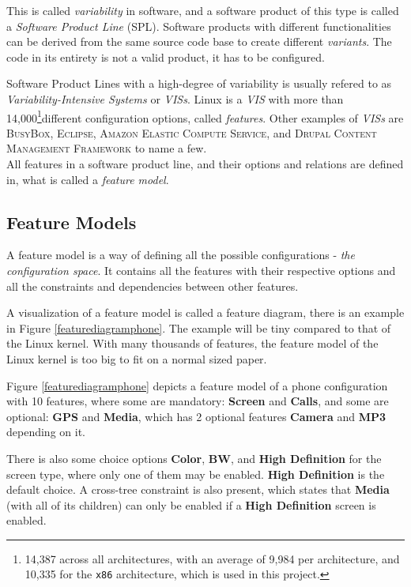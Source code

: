 \documentclass[a4paper,11pt]{report}
\newcommand{\f}{\footnote{\fn}}
\begin{document}
This is called \emph{variability} in software, and a software product of 
this type is called a \emph{Software Product Line} (SPL). Software products 
with different functionalities can be derived from the same 
source code base to create different \emph{variants}. The code in its entirety is not a valid product\cite[p. 
1]{IntDatSPL}, it has to be configured.
\\

        \def \fn {14,387 across all architectures, with an average of 9,984 per 
        architecture, and 10,335 for the \texttt{x86} architecture, which is used
        in this project.}

Software Product Lines with a high-degree of variability is usually refered to as 
\emph{Variability-Intensive Systems} or \emph{VISs}. Linux is a \emph{VIS} with 
more than 14,000\f different configuration options, called \emph{features}.
Other examples of \emph{VISs} are \textsc{BusyBox}, \textsc{Eclipse}, 
\textsc{Amazon Elastic Compute Service}, and \textsc{Drupal Content Management 
Framework}\cite[p. 1]{VarTesDrupal} to name a few.
\\

All features in a software product line, and their options and relations are 
defined in, what is called a \emph{feature model}.

            \subsection{Feature Models}

A feature model is a way of defining all the possible configurations - 
\emph{the configuration space}. It contains all the features with their 
respective options and all the constraints and dependencies between other features.

A visualization of a feature model is called a feature diagram, there is an 
example in Figure \ref{featurediagramphone}. The example will be tiny compared 
to that of the Linux kernel. With many thousands of features, the feature model 
of the Linux kernel is too big to fit on a normal sized paper.

Figure \ref{featurediagramphone} depicts a feature model of a phone 
configuration with 10 features, where some are mandatory: \textbf{Screen} and 
\textbf{Calls}, and some are optional: \textbf{GPS} and \textbf{Media}, which has 2
optional features \textbf{Camera} and \textbf{MP3} depending on it.

There is also some choice options \textbf{Color}, \textbf{BW}, and \textbf{High 
Definition} for the screen type, where only one of them may be enabled. 
\textbf{High Definition} is the default choice. A 
cross-tree constraint is also present, which states that \textbf{Media} (with 
all of its children) can only be enabled if a \textbf{High Definition} screen is 
enabled.
\end{document}
